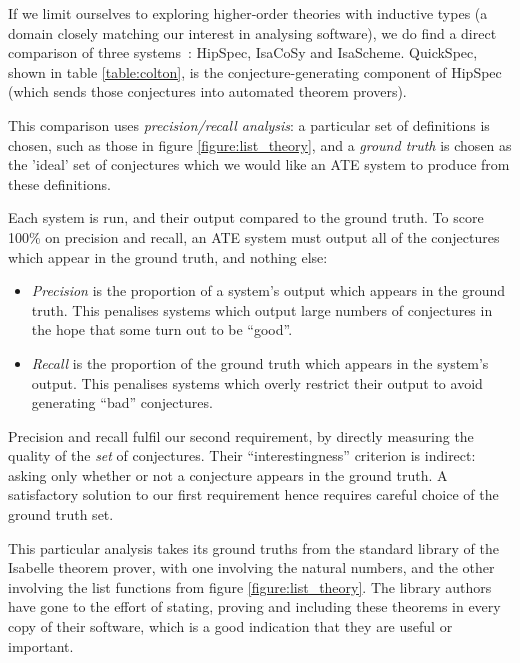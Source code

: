 
If we limit ourselves to exploring higher-order theories with inductive types
(a domain closely matching our interest in analysing software), we do find a
direct comparison of three systems~\cite{claessen2013automating}: HipSpec,
IsaCoSy and IsaScheme. QuickSpec, shown in table \ref{table:colton}, is the
conjecture-generating component of HipSpec (which sends those conjectures into
automated theorem provers).

This comparison uses \emph{precision/recall analysis}: a particular set of
definitions is chosen, such as those in figure \ref{figure:list_theory}, and a
\emph{ground truth} is chosen as the 'ideal' set of conjectures which we would
like an ATE system to produce from these definitions.

Each system is run, and their output compared to the ground truth. To score
100\% on precision and recall, an ATE system must output all of the conjectures
which appear in the ground truth, and nothing else:

\begin{itemize}
\item \emph{Precision} is the proportion of a system's output which appears in
  the ground truth. This penalises systems which output large numbers of
  conjectures in the hope that some turn out to be ``good''.
\item \emph{Recall} is the proportion of the ground truth which appears in the
  system's output. This penalises systems which overly restrict their output to
  avoid generating ``bad'' conjectures.
\end{itemize}

Precision and recall fulfil our second requirement, by directly measuring the
quality of the \emph{set} of conjectures. Their ``interestingness'' criterion is
indirect: asking only whether or not a conjecture appears in the ground truth.
A satisfactory solution to our first requirement hence requires careful choice
of the ground truth set.

This particular analysis takes its ground truths from the standard library of
the Isabelle theorem prover, with one involving the natural numbers, and the
other involving the list functions from figure \ref{figure:list_theory}. The library authors have gone to the effort of stating,
proving and including these theorems in every copy of their software, which is a
good indication that they are useful or important.

